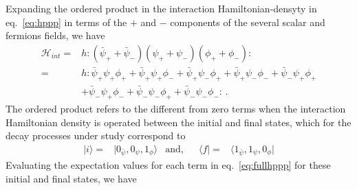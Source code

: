 Expanding the ordered product in the interaction Hamiltonian-densyty in eq.~\eqref{eq:hppp} in terms of the  $+$ and $-$ components of the several scalar and fermions fields, we have
\begin{align}
\label{eq:fullhppp}
 \mathcal{H}_{int}=&h:\left( \bar{\psi}_{+}+\bar{\psi}_{-}\right) \left( \psi_{+}+\psi_{-}\right) \left( \phi_{+}+\phi_{-}\right):\nonumber\\
=&h:
\bar{\psi}_{+}\psi_{+}\phi_{+}+ 
\bar{\psi}_{+}\psi_{+}\phi_{-}+ 
\bar{\psi}_{+}\psi_{-}\phi_{+}+ 
\bar{\psi}_{+}\psi_{-}\phi_{-}+ 
\bar{\psi}_{-}\psi_{+}\phi_{+}\nonumber\\ 
&+\bar{\psi}_{-}\psi_{+}\phi_{-}+ 
\bar{\psi}_{-}\psi_{-}\phi_{+}+ 
\bar{\psi}_{-}\psi_{-}\phi_{-} 
:\,.
\end{align}
The ordered product refers to the different from zero terms when the interaction Hamiltonian density is operated between the initial and final states, which for the decay processes under study correspond to
\begin{align}
  |i\rangle=&|0_{\bar{\psi}},0_{\psi},1_{\phi}\rangle & \text{and,} && \langle f|=&\langle 1_{\bar{\psi}},1_{\psi},0_\phi|
\end{align}
Evaluating the expectation values for each term in eq.~\eqref{eq:fullhppp} for these initial and final states, we have
